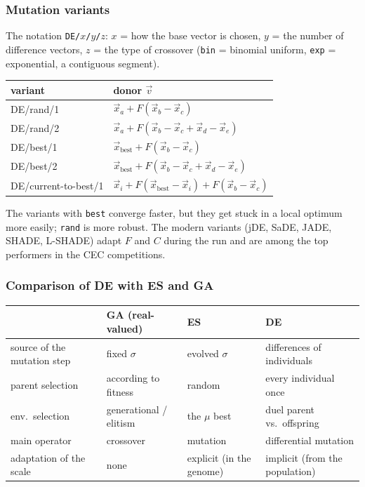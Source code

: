 \documentclass[11pt,a4paper]{article}
\theoremstyle{definition}
\begin{document}
\subsubsection{Mutation variants}

The notation \texttt{DE/$x$/$y$/$z$}: $x$ = how the base vector is chosen,
$y$ = the number of difference vectors, $z$ = the type of crossover
(\texttt{bin} = binomial uniform, \texttt{exp} = exponential, a contiguous
segment).

\begin{center}
\begin{tabular}{@{}ll@{}}
\toprule
\textbf{variant} & \textbf{donor $\vec v$} \\
\midrule
DE/rand/1 & $\vec x_a + F(\vec x_b - \vec x_c)$ \\
DE/rand/2 & $\vec x_a + F(\vec x_b - \vec x_c + \vec x_d - \vec x_e)$ \\
DE/best/1 & $\vec x_{\mathrm{best}} + F(\vec x_b - \vec x_c)$ \\
DE/best/2 & $\vec x_{\mathrm{best}} + F(\vec x_b - \vec x_c + \vec x_d - \vec x_e)$ \\
DE/current-to-best/1 & $\vec x_i + F(\vec x_{\mathrm{best}} - \vec x_i) + F(\vec x_b - \vec x_c)$ \\
\bottomrule
\end{tabular}
\end{center}

The variants with \texttt{best} converge faster, but they get stuck in a local
optimum more easily; \texttt{rand} is more robust. The modern variants (jDE,
SaDE, JADE, SHADE, L-SHADE) adapt $F$ and $C$ during the run and are among the
top performers in the CEC competitions.

\subsubsection{Comparison of DE with ES and GA}

\begin{center}
\begin{tabular}{@{}p{3.2cm}p{3.7cm}p{3.7cm}p{3.7cm}@{}}
\toprule
 & \textbf{GA (real-valued)} & \textbf{ES} & \textbf{DE} \\
\midrule
source of the mutation step & fixed $\sigma$ & evolved $\sigma$ & differences of
  individuals \\
parent selection & according to fitness & random & every individual once \\
env.\ selection & generational / elitism & the $\mu$ best & duel parent vs.\
  offspring \\
main operator & crossover & mutation & differential mutation \\
adaptation of the scale & none & explicit (in the genome) & implicit (from the
  population) \\
\bottomrule
\end{tabular}
\end{center}
\end{document}
